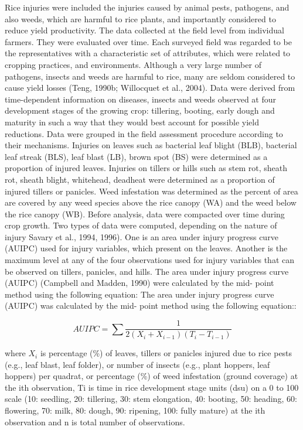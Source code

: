 Rice injuries were included the injuries caused by animal pests, pathogens, and also weeds, which are harmful to rice plants, and importantly considered to reduce yield productivity. The data collected at the field level from individual farmers. They were evaluated over time. Each surveyed field was regarded to be the representatives with a characteristic set of attributes, which were related to cropping practices, and environments. Although a very large number of pathogens, insects and weeds are harmful to rice, many are seldom considered to cause yield losses (Teng, 1990b; Willocquet et al., 2004). Data were derived from time-dependent information on diseases, insects and weeds observed at four development stages of the growing crop: tillering, booting, early dough and maturity in such a way that they would best account for possible yield reductions. Data were grouped in the field assessment procedure according to their mechanisms. Injuries on leaves such as bacterial leaf blight (BLB), bacterial leaf streak (BLS), leaf blast (LB), brown spot (BS) were determined as a proportion of injured leaves. Injuries on tillers or hills such as stem rot, sheath rot, sheath blight, whitehead, deadheat were determined as a proportion of injured tillers or panicles. Weed infestation was determined as the percent of area are covered by any weed species above the rice canopy (WA) and the weed below the rice canopy (WB). Before analysis, data were compacted over time during crop growth. Two types of data were computed, depending on the nature of injury Savary et al., 1994, 1996). One is an area under injury progress curve (AUIPC) used for injury variables, which present on the leaves. Another is the maximum level at any of the four observations used for injury variables that can be observed on tillers, panicles, and hills. The area under injury progress curve (AUIPC) (Campbell and Madden, 1990) were calculated by the mid- point method using the following equation: The area under injury progress curve (AUIPC) was calculated by the mid- point method using the following equation::

\begin{equation}
AUIPC = \sum{\frac{1}{2(X_{i} + X_{i-1})(T_{i} - T_{i-1})}}
\end{equation}

where $X_i$ is percentage (\%) of leaves, tillers or panicles injured due to rice pests (e.g., leaf blast, leaf folder), or number of insects (e.g., plant hoppers, leaf hoppers) per quadrat, or percentage (\%) of weed infestation (ground coverage) at the ith observation, Ti is time in rice development stage units (dsu) on a 0 to 100 scale (10: seedling, 20: tillering, 30: stem elongation, 40: booting, 50: heading, 60: flowering, 70: milk, 80: dough, 90: ripening, 100: fully mature) at the ith observation and n is total number of observations.